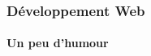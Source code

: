 \documentclass[xcolor=table]{beamer}
\begin{document}
\begin{frame}
\frametitle{Développement Web}
\framesubtitle{Un peu d'humour}

\begin{center}
\end{center}

\end{frame}

\end{document}

